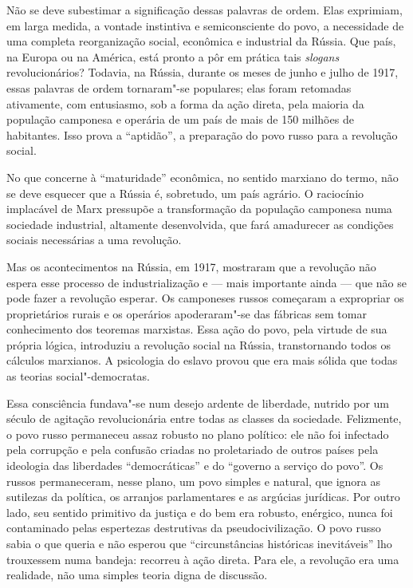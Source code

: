 Não se deve subestimar a significação dessas palavras de ordem. Elas
exprimiam, em larga medida, a vontade instintiva e semiconsciente do
povo, a necessidade de uma completa reorganização social, econômica e
industrial da Rússia. Que país, na Europa ou na América, está pronto a
pôr em prática tais \textit{slogans} revolucionários? Todavia, na Rússia,
durante os meses de junho e julho de 1917, essas palavras de ordem
tornaram"-se populares; elas foram retomadas ativamente, com
entusiasmo, sob a forma da ação direta, pela maioria da população
camponesa e operária de um país de mais de 150 milhões de habitantes.
Isso prova a “aptidão”, a preparação do povo russo para a revolução
social.

No que concerne à “maturidade” econômica, no sentido marxiano do termo,
não se deve esquecer que a Rússia é, sobretudo, um país agrário. O
raciocínio implacável de Marx pressupõe a transformação da população
camponesa numa sociedade industrial, altamente desenvolvida, que fará
amadurecer as condições sociais necessárias a uma revolução.

Mas os acontecimentos na Rússia, em 1917, mostraram que a revolução não
espera esse processo de industrialização e --- mais importante ainda ---
que não se pode fazer a revolução esperar. Os camponeses russos
começaram a expropriar os proprietários rurais e os operários
apoderaram"-se das fábricas sem tomar conhecimento dos teoremas
marxistas. Essa ação do povo, pela virtude de sua própria lógica,
introduziu a revolução social na Rússia, transtornando todos os
cálculos marxianos. A psicologia do eslavo provou que era mais sólida
que todas as teorias social"-democratas.

Essa consciência fundava"-se num desejo ardente de liberdade, nutrido
por um século de agitação revolucionária entre todas as classes da
sociedade. Felizmente, o povo russo permaneceu assaz robusto no plano
político: ele não foi infectado pela corrupção e pela confusão criadas
no proletariado de outros países pela ideologia das liberdades
“democráticas” e do “governo a serviço do povo”. Os russos
permaneceram, nesse plano, um povo simples e natural, que ignora as
sutilezas da política, os arranjos parlamentares e as argúcias jurídicas.
Por outro lado, seu sentido primitivo da justiça e do bem era robusto,
enérgico, nunca foi contaminado pelas espertezas destrutivas da
pseudocivilização. O povo russo sabia o que queria e não esperou que
“circunstâncias históricas inevitáveis” lho trouxessem numa bandeja:
recorreu à ação direta. Para ele, a revolução era uma realidade, não
uma simples teoria digna de discussão.

